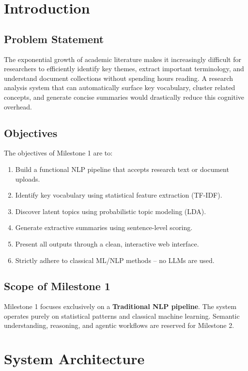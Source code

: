 \documentclass[12pt, a4paper]{article}
\begin{document}
\section{Introduction}

\subsection{Problem Statement}
The exponential growth of academic literature makes it increasingly difficult for researchers to efficiently identify key themes, extract important terminology, and understand document collections without spending hours reading. A research analysis system that can automatically surface key vocabulary, cluster related concepts, and generate concise summaries would drastically reduce this cognitive overhead.

\subsection{Objectives}
The objectives of Milestone 1 are to:
\begin{enumerate}
  \item Build a functional NLP pipeline that accepts research text or document uploads.
  \item Identify key vocabulary using statistical feature extraction (TF-IDF).
  \item Discover latent topics using probabilistic topic modeling (LDA).
  \item Generate extractive summaries using sentence-level scoring.
  \item Present all outputs through a clean, interactive web interface.
  \item Strictly adhere to classical ML/NLP methods -- no LLMs are used.
\end{enumerate}

\subsection{Scope of Milestone 1}
Milestone 1 focuses exclusively on a \textbf{Traditional NLP pipeline}. The system operates purely on statistical patterns and classical machine learning. Semantic understanding, reasoning, and agentic workflows are reserved for Milestone 2.

\section{System Architecture}
\end{document}
